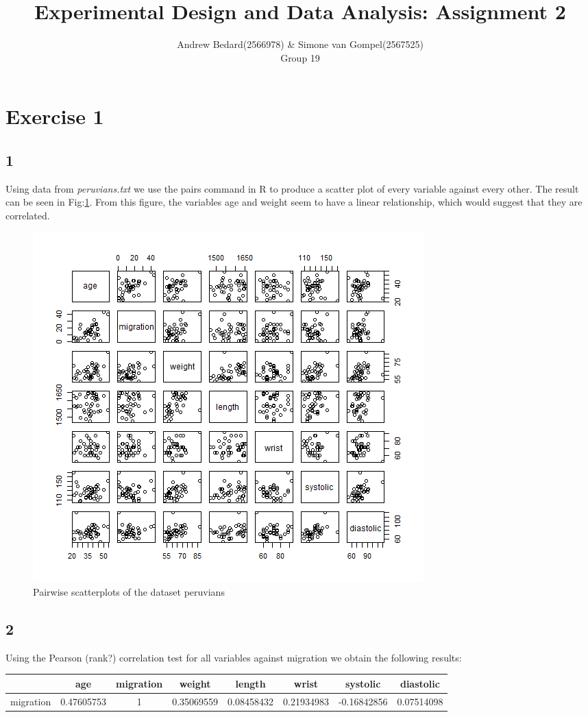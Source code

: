 \documentclass{article}
\title{Experimental Design and Data Analysis: Assignment 2}
\author{Andrew Bedard(2566978) \& Simone van Gompel(2567525) \\ Group 19}
\begin{document}
  \maketitle

  \section{Exercise 1}
  \subsection*{1}
  Using data from \textit{peruvians.txt} we use the pairs command in R to produce a scatter plot of every variable against every other. The result can be seen in Fig:\ref{fig:Pairs}. From this figure, the variables age and weight seem to have a linear relationship, which would suggest that they are correlated.

    \begin{figure}[!htb]
      \includegraphics[scale=0.6]{../results/Pairs.png}
      \caption{Pairwise scatterplots of the dataset peruvians}
      \label{fig:Pairs}
    \end{figure}
    
    \subsection*{2}
    Using the Pearson (rank?) correlation test for all variables against migration we obtain the following results:
    \newline
    \begin{tabular}{|c|c|c|c|c|c|c|c|}
    \hline 
     & age & migration & weight & length & wrist & systolic & diastolic \\ 
    \hline 
    migration & 0.47605753 & 1 & 0.35069559 & 0.08458432 & 0.21934983 & -0.16842856 & 0.07514098 \\ 
    \hline 
    \end{tabular} 
    
\end{document}

